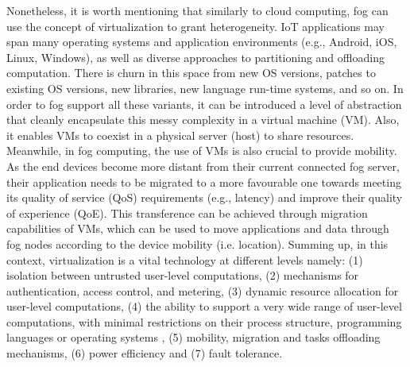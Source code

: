 \noindent\tab Nonetheless, it is worth mentioning that similarly to cloud computing, fog can use the concept of virtualization to grant heterogeneity. IoT applications may span many operating systems and application environments (e.g., Android, iOS, Linux, Windows), as well as diverse approaches to partitioning and offloading computation. There is churn in this space from new OS versions, patches to existing OS versions, new libraries, new language run-time systems, and so on. In order to fog support all these variants, it can be introduced a level of abstraction that cleanly encapsulate this messy complexity in a virtual machine (VM). Also, it enables VMs to coexist in a physical server (host) to share resources. Meanwhile, in fog computing, the use of VMs is also crucial to provide mobility. As the end devices become more distant from their current connected fog server, their application needs to be migrated to a more favourable one towards meeting its quality of service (QoS) requirements (e.g., latency) and improve their quality of experience (QoE). This transference can be achieved through migration capabilities of VMs, which can be used to move applications and data through fog nodes according to the device mobility (i.e. location). Summing up, in this context, virtualization is a vital technology at different levels namely: (1) isolation between untrusted user-level computations, (2) mechanisms for authentication, access control, and metering, (3) dynamic resource allocation for user-level computations, (4) the ability to support a very wide range of user-level computations, with minimal restrictions on their process structure, programming languages or operating systems \cite{Cloudlet83:online}, (5) mobility, migration and tasks offloading mechanisms, (6) power efficiency and (7) fault tolerance.\\

